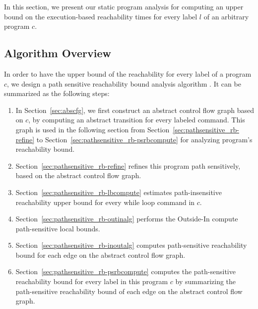In this section, we present our static program analysis for computing an upper bound on the 
execution-based reachability times for every label $l$ of an arbitrary program $c$.
%
\subsection{Algorithm Overview}
\label{sec:alg_overview}
In order to have the upper bound of the reachability for every label of a program $c$, we design 
a path sensitive reachability bound analysis algorithm {\THESYSTEM}.
It can be summarized as the following steps: 
%
%
\begin{enumerate}
\item  In Section~\ref{sec:abscfg}, we first construct an abstract control flow graph based on $c$, by computing an abstract transition 
for every labeled command. 
This graph is used in the following section from Section~\ref{sec:pathsensitive_rb-refine} to Section~\ref{sec:pathsensitive_rb-psrbcompute} for analyzing program's reachability bound.
\item Section~\ref{sec:pathsensitive_rb-refine} refines this program path sensitively, based on the abstract control flow graph.
\item Section~\ref{sec:pathsensitive_rb-lbcompute} estimates path-insensitive reachability upper bound for every while loop command in $c$.
\item Section~\ref{sec:pathsensitive_rb-outinalg} performs the Outside-In compute path-sensitive local bounds.
\item Section~\ref{sec:pathsensitive_rb-inoutalg} computes path-sensitive reachability bound for each edge on the abstract control flow graph.
\item Section~\ref{sec:pathsensitive_rb-psrbcompute} computes the path-sensitive reachability bound for every label in this program $c$ by summarizing 
the path-sensitive reachability bound of each edge on the abstract control flow graph.
\end{enumerate}

